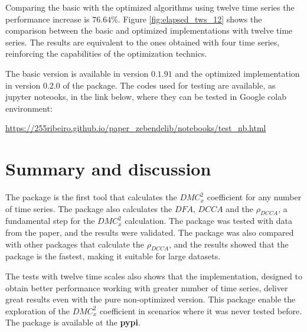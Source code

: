 \documentclass[article]{jss}
\begin{document}
Comparing the basic with the optimized  algorithms using twelve time series the performance increase is $76.64\%$. Figure \ref{fig:elapsed_tws_12} shows the comparison between the basic and optimized  implementations with twelve time series. The results are equivalent to the ones obtained with four time series, reinforcing the capabilities of the optimization technics.

The basic version is available in  version $0.1.91$ and the optimized implementation in version $0.2.0$ of the package. The codes used for testing are available, as jupyter noteooks, in the link below, where they can be tested in Google colab environment:

\begin{center}
  \url{https://255ribeiro.github.io/paper_zebendelib/notebooks/test_nb.html}
\end{center}



\section{Summary and discussion} \label{sec:summary}

The  package is the first tool that calculates the $DMC_{x}^{2}$ coefficient for any number of time series. The package also calculates the $DFA$, $DCCA$ and the $\rho_{DCCA}$, a fundamental step for the $DMC_{x}^{2}$ calculation. The package was tested with data from the \cite{RIBEIRO2025107419} paper, and the results were validated. The package was also compared with other packages that calculate the $\rho_{DCCA}$, and the results showed that the  package is the fastest, making it suitable for large datasets.

The tests with twelve time scales also shows that the  implementation, designed to obtain better performance working with greater number of time series, deliver great results even with the pure  non-optimized version. This package enable the exploration of the $DMC_x^2$ coefficient in scenarios where it was never tested before. The package is available at the \textbf{pypi}.



\end{document}
